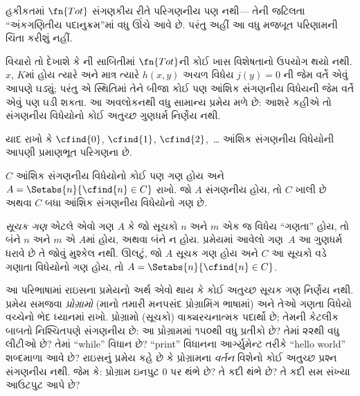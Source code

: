 \begin{digress}
હકીકતમાં $\fn{Tot}$ સંગણકીય રીતે પરિગણનીય પણ નથી---
તેની જટિલતા ``અંકગણિતીય પદાનુક્રમ''માં વધુ ઊંચે આવે છે.
પરંતુ અહીં આ વધુ મજબૂત પરિણામની ચિંતા કરીશું નહીં.
\end{digress}
\endgroup


\begingroup
\makeatletter{}\makeatother

\label{guunit:OLP-0248}


વિચારો તો દેખાશે કે ની સાબિતીમાં
$\fn{Tot}$ની કોઈ ખાસ વિશેષતાનો ઉપયોગ થયો નથી. $x$, $K$માં
હોય ત્યારે અને માત્ર ત્યારે $h(x,y)$ અચળ વિધેય $j(y) = 0$
ની જેમ વર્તે એવું આપણે ઘડ્યું; પરંતુ એ સ્થિતિમાં તેને
બીજા કોઈ પણ આંશિક સંગણનીય વિધેયની જેમ વર્તે એવું પણ
ઘડી શકતા. આ અવલોકનથી વધુ સામાન્ય પ્રમેય મળે છે:
આશરે કહીએ તો સંગણનીય વિધેયોનો કોઈ અતુચ્છ ગુણધર્મ
નિર્ણેય નથી.

યાદ રાખો કે $\cfind{0}$, $\cfind{1}$, $\cfind{2}$,~\dots
આંશિક સંગણનીય વિધેયોની આપણી પ્રમાણભૂત પરિગણના છે.

\begin{thm}[રાઇસનું પ્રમેય]
  $C$ આંશિક સંગણનીય વિધેયોનો કોઈ પણ ગણ હોય અને
  $A = \Setabs{n}{\cfind{n} \in C}$ રાખો. જો $A$ સંગણનીય
  હોય, તો $C$ ખાલી છે અથવા $C$ બધા આંશિક સંગણનીય
  વિધેયોનો ગણ છે.
\end{thm}

\emph{સૂચક ગણ} એટલે એવો ગણ $A$ કે જો સૂચકો $n$ અને $m$
એક જ વિધેય ``ગણતા'' હોય, તો બંને $n$ અને $m$ એ $A$માં
હોય, અથવા બંને ન હોય. પ્રમેયમાં આવેલો ગણ~$A$ આ
ગુણધર્મ ધરાવે છે તે જોવું મુશ્કેલ નથી. ઊલટું, જો $A$
સૂચક ગણ હોય અને $C$ આ સૂચકો વડે ગણાતા વિધેયોનો ગણ
હોય, તો $A = \Setabs{n}{\cfind{n} \in C}$.

\begin{explain}
આ પરિભાષામાં રાઇસના પ્રમેયનો અર્થ એવો થાય કે કોઈ અતુચ્છ
સૂચક ગણ નિર્ણેય નથી. પ્રમેય સમજવા \emph{પ્રોગ્રામો}
(માનો તમારી મનપસંદ પ્રોગ્રામિંગ ભાષામાં) અને તેઓ ગણતા
વિધેયો વચ્ચેનો ભેદ ધ્યાનમાં રાખો. પ્રોગ્રામો (સૂચકો)
વાક્યરચનાત્મક પદાર્થો છે; તેમની કેટલીક બાબતો નિશ્ચિતપણે
સંગણનીય છે: આ પ્રોગ્રામમાં ૧૫૦થી વધુ પ્રતીકો છે? તેમાં
૨૨થી વધુ લીટીઓ છે? તેમાં ``while'' વિધાન છે? ``print''
વિધાનના આર્ગ્યુમેન્ટ તરીકે ``hello world'' શબ્દમાળા આવે
છે? રાઇસનું પ્રમેય કહે છે કે પ્રોગ્રામના \emph{વર્તન}
વિશેનો કોઈ અતુચ્છ પ્રશ્ન સંગણનીય નથી. જેમ કે: પ્રોગ્રામ
ઇનપુટ $0$ પર થંભે છે? તે કદી થંભે છે? તે કદી સમ સંખ્યા
આઉટપુટ આપે છે?
\end{explain}

